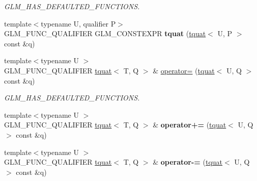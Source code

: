 \begin{DoxyCompactItemize}
\begin{DoxyCompactList}\small\item\em G\+L\+M\+\_\+\+H\+A\+S\+\_\+\+D\+E\+F\+A\+U\+L\+T\+E\+D\+\_\+\+F\+U\+N\+C\+T\+I\+O\+NS. \end{DoxyCompactList}\item 
\mbox{\label{structglm_1_1tquat_a7646314c6d0f3d3f4df1e940e3181baa}} 
{\footnotesize template$<$typename U, qualifier P$>$ }\\G\+L\+M\+\_\+\+F\+U\+N\+C\+\_\+\+Q\+U\+A\+L\+I\+F\+I\+ER G\+L\+M\+\_\+\+C\+O\+N\+S\+T\+E\+X\+PR {\bfseries tquat} (\hyperlink{structglm_1_1tquat}{tquat}$<$ U, P $>$ const \&q)
\item 
\mbox{\label{structglm_1_1tquat_abbfc6f4a48d94487207b0aef77a2809c}} 
{\footnotesize template$<$typename U $>$ }\\G\+L\+M\+\_\+\+F\+U\+N\+C\+\_\+\+Q\+U\+A\+L\+I\+F\+I\+ER \hyperlink{structglm_1_1tquat}{tquat}$<$ T, Q $>$ \& \hyperlink{structglm_1_1tquat_abbfc6f4a48d94487207b0aef77a2809c}{operator=} (\hyperlink{structglm_1_1tquat}{tquat}$<$ U, Q $>$ const \&q)
\begin{DoxyCompactList}\small\item\em G\+L\+M\+\_\+\+H\+A\+S\+\_\+\+D\+E\+F\+A\+U\+L\+T\+E\+D\+\_\+\+F\+U\+N\+C\+T\+I\+O\+NS. \end{DoxyCompactList}\item 
\mbox{\label{structglm_1_1tquat_afe4fd15b1ec1080a813466f1ab3509c5}} 
{\footnotesize template$<$typename U $>$ }\\G\+L\+M\+\_\+\+F\+U\+N\+C\+\_\+\+Q\+U\+A\+L\+I\+F\+I\+ER \hyperlink{structglm_1_1tquat}{tquat}$<$ T, Q $>$ \& {\bfseries operator+=} (\hyperlink{structglm_1_1tquat}{tquat}$<$ U, Q $>$ const \&q)
\item 
\mbox{\label{structglm_1_1tquat_a4b913cb3c700dfbe26207223690ac255}} 
{\footnotesize template$<$typename U $>$ }\\G\+L\+M\+\_\+\+F\+U\+N\+C\+\_\+\+Q\+U\+A\+L\+I\+F\+I\+ER \hyperlink{structglm_1_1tquat}{tquat}$<$ T, Q $>$ \& {\bfseries operator-\/=} (\hyperlink{structglm_1_1tquat}{tquat}$<$ U, Q $>$ const \&q)
\item 
\mbox{\label{structglm_1_1tquat_a7cfc09d64f373aba2b65cb58691f1607}} 

\end{DoxyCompactItemize}
